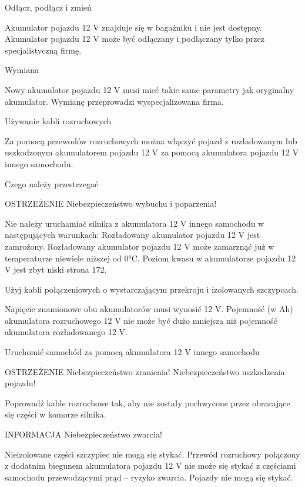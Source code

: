 Odłącz, podłącz i zmień

Akumulator pojazdu 12 V znajduje się w bagażniku i nie jest dostępny. Akumulator pojazdu 12 V może być odłączany i podłączany tylko przez specjalistyczną firmę.

Wymiana

Nowy akumulator pojazdu 12 V musi mieć takie same parametry jak oryginalny akumulator. Wymianę przeprowadzi wyspecjalizowana firma.

Używanie kabli rozruchowych

Za pomocą przewodów rozruchowych można włączyć pojazd z rozładowanym lub uszkodzonym akumulatorem pojazdu 12 V za pomocą akumulatora pojazdu 12 V innego samochodu.

Czego należy przestrzegać

OSTRZEŻENIE
Niebezpieczeństwo wybuchu i poparzenia!
\begin{itemizeTriangle}
	\itemTriangle Nie należy uruchamiać silnika z akumulatora 12 V innego samochodu w następujących warunkach:
		\itemTriangle Rozładowany akumulator pojazdu 12 V jest zamrożony. Rozładowany akumulator pojazdu 12 V może zamarznąć już w temperaturze niewiele niższej od 0°C.
		\itemTriangle Poziom kwasu w akumulatorze pojazdu 12 V jest zbyt niski \guillemotright strona 172.
\end{itemizeTriangle}

Użyj kabli połączeniowych o wystarczającym przekroju i izolowanych szczypcach.

Napięcie znamionowe obu akumulatorów musi wynosić 12 V. Pojemność (w Ah) akumulatora rozruchowego 12 V nie może być dużo mniejsza niż pojemność akumulatora rozładowanego 12 V.

Uruchomić samochód za pomocą akumulatora 12 V innego samochodu

OSTRZEŻENIE
Niebezpieczeństwo zranienia! Niebezpieczeństwo uszkodzenia pojazdu!
\begin{itemizeTriangle}
	\itemTriangle Poprowadź kable rozruchowe tak, aby nie zostały pochwycone przez obracające się części w komorze silnika.
\end{itemizeTriangle}

INFORMACJA
Niebezpieczeństwo zwarcia!
\begin{itemizeTriangle}
	\itemTriangle Nieizolowane części szczypiec nie mogą się stykać.
	\itemTriangle Przewód rozruchowy połączony z dodatnim biegunem akumulatora pojazdu 12 V nie może się stykać z częściami samochodu przewodzącymi prąd – ryzyko zwarcia.
	\itemTriangle Pojazdy nie mogą się stykać.
\end{itemizeTriangle}

